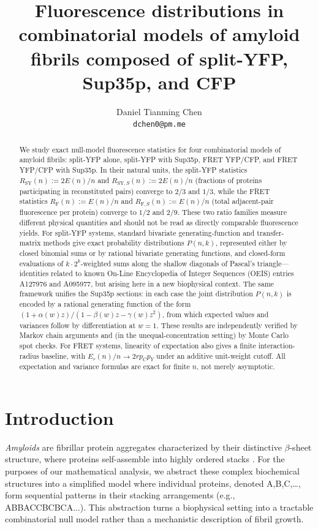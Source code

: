 \documentclass[11pt]{article}
\title{Fluorescence distributions in combinatorial models of amyloid fibrils composed of split-YFP, Sup35p, and CFP}
\author{Daniel Tianming Chen \\ \texttt{dchen0@pm.me}}
\begin{document}
\maketitle

\begin{abstract}
We study exact null-model fluorescence statistics for four combinatorial models of amyloid fibrils: split-YFP alone, split-YFP with Sup35p, FRET YFP/CFP, and FRET YFP/CFP with Sup35p. In their natural units, the split-YFP statistics $R_{\text{SY}}(n) := 2E(n)/n$ and $R_{\text{SY},S}(n) := 2E(n)/n$ (fractions of proteins participating in reconstituted pairs) converge to $2/3$ and $1/3$, while the FRET statistics $R_{\text{F}}(n) := E(n)/n$ and $R_{\text{F},S}(n) := E(n)/n$ (total adjacent-pair fluorescence per protein) converge to $1/2$ and $2/9$. These two ratio families measure different physical quantities and should not be read as directly comparable fluorescence yields. For split-YFP systems, standard bivariate generating-function and transfer-matrix methods give exact probability distributions $P(n,k)$, represented either by closed binomial sums or by rational bivariate generating functions, and closed-form evaluations of $k \cdot 2^k$-weighted sums along the shallow diagonals of Pascal's triangle---identities related to known On-Line Encyclopedia of Integer Sequences (OEIS) entries A127976 and A095977, but arising here in a new biophysical context. The same framework unifies the Sup35p sections: in each case the joint distribution $P(n,k)$ is encoded by a rational generating function of the form $(1 + \alpha(w) z)/(1 - \beta(w) z - \gamma(w) z^2)$, from which expected values and variances follow by differentiation at $w = 1$. These results are independently verified by Markov chain arguments and (in the unequal-concentration setting) by Monte Carlo spot checks. For FRET systems, linearity of expectation also gives a finite interaction-radius baseline, with $E_r(n)/n \to 2r p_Cp_Y$ under an additive unit-weight cutoff. All expectation and variance formulas are exact for finite $n$, not merely asymptotic.
\end{abstract}

\section{Introduction}
\textit{Amyloids} are fibrillar protein aggregates characterized by their distinctive $\beta$-sheet structure, where proteins self-assemble into highly ordered stacks \cite{chiti2006}. For the purposes of our mathematical analysis, we abstract these complex biochemical structures into a simplified model where individual proteins, denoted A,B,C,\ldots, form sequential patterns in their stacking arrangements (e.g., ABBACCBCBCA...). This abstraction turns a biophysical setting into a tractable combinatorial null model rather than a mechanistic description of fibril growth.
\end{document}
